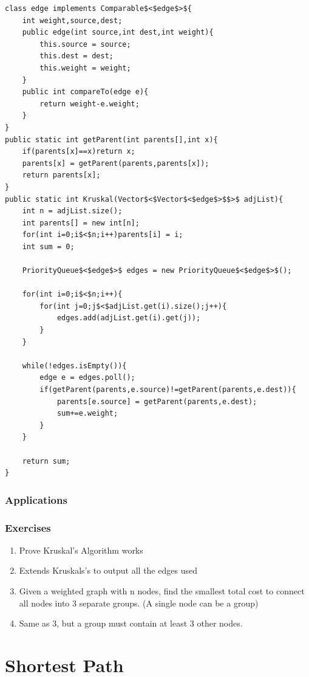 \documentclass[11pt,oneside]{book}
\begin{document}
\begin{lstlisting}
class edge implements Comparable$<$edge$>${
    int weight,source,dest;
    public edge(int source,int dest,int weight){
        this.source = source;
        this.dest = dest;
        this.weight = weight;
    }
    public int compareTo(edge e){
        return weight-e.weight;
    }
}
public static int getParent(int parents[],int x){
    if(parents[x]==x)return x;
    parents[x] = getParent(parents,parents[x]);
    return parents[x];
}
public static int Kruskal(Vector$<$Vector$<$edge$>$$>$ adjList){
    int n = adjList.size();
    int parents[] = new int[n];
    for(int i=0;i$<$n;i++)parents[i] = i;
    int sum = 0;
    
    PriorityQueue$<$edge$>$ edges = new PriorityQueue$<$edge$>$();
    
    for(int i=0;i$<$n;i++){
        for(int j=0;j$<$adjList.get(i).size();j++){
            edges.add(adjList.get(i).get(j));
        }
    }
    
    while(!edges.isEmpty()){
        edge e = edges.poll();
        if(getParent(parents,e.source)!=getParent(parents,e.dest)){
            parents[e.source] = getParent(parents,e.dest);
            sum+=e.weight;
        }
    }
    
    return sum;
}
\end{lstlisting}

\subsection{Applications}

\subsection{Exercises}

\begin{enumerate}
\item Prove Kruskal's Algorithm works
\item Extends Kruskals's to output all the edges used
\item Given a weighted graph with n nodes, find the smallest total cost to connect all nodes into 3 separate groups. (A single node can be a group)
\item Same as 3, but a group must contain at least 3 other nodes.
\end{enumerate}

    \chapter{ Shortest Path }
        
\end{document}
